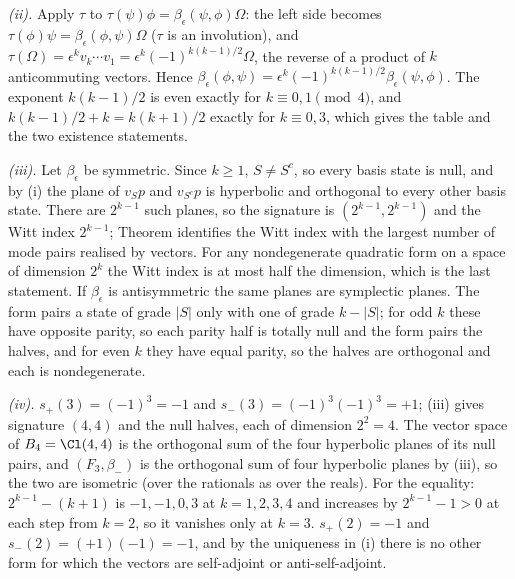 \emph{(ii).} Apply $\tau$ to $\tau(\psi)\phi = \beta_{\epsilon}(\psi, \phi)\Omega$: the left side becomes $\tau(\phi)\psi = \beta_{\epsilon}(\phi, \psi)\Omega$ ($\tau$ is an involution), and $\tau(\Omega) = \epsilon^{k}v_{k}\cdots v_{1} = \epsilon^{k}(-1)^{k(k-1)/2}\Omega$, the reverse of a product of $k$ anticommuting vectors. Hence $\beta_{\epsilon}(\phi, \psi) = \epsilon^{k}(-1)^{k(k-1)/2}\beta_{\epsilon}(\psi, \phi)$. The exponent $k(k-1)/2$ is even exactly for $k \equiv 0, 1 \pmod 4$, and $k(k-1)/2 + k = k(k+1)/2$ exactly for $k \equiv 0, 3$, which gives the table and the two existence statements.

\emph{(iii).} Let $\beta_{\epsilon}$ be symmetric. Since $k \ge 1$, $S \ne S^{c}$, so every basis state is null, and by (i) the plane of $v_{S}p$ and $v_{S^{c}}p$ is hyperbolic and orthogonal to every other basis state. There are $2^{k-1}$ such planes, so the signature is $(2^{k-1}, 2^{k-1})$ and the Witt index $2^{k-1}$; Theorem  identifies the Witt index with the largest number of mode pairs realised by vectors. For any nondegenerate quadratic form on a space of dimension $2^{k}$ the Witt index is at most half the dimension, which is the last statement. If $\beta_{\epsilon}$ is antisymmetric the same planes are symplectic planes. The form pairs a state of grade $|S|$ only with one of grade $k - |S|$; for odd $k$ these have opposite parity, so each parity half is totally null and the form pairs the halves, and for even $k$ they have equal parity, so the halves are orthogonal and each is nondegenerate.

\emph{(iv).} $s_{+}(3) = (-1)^{3} = -1$ and $s_{-}(3) = (-1)^{3}(-1)^{3} = +1$; (iii) gives signature $(4,4)$ and the null halves, each of dimension $2^{2} = 4$. The vector space of $B_{4} = \Cl(4,4)$ is the orthogonal sum of the four hyperbolic planes of its null pairs, and $(F_{3}, \beta_{-})$ is the orthogonal sum of four hyperbolic planes by (iii), so the two are isometric (over the rationals as over the reals). For the equality: $2^{k-1} - (k+1)$ is $-1, -1, 0, 3$ at $k = 1, 2, 3, 4$ and increases by $2^{k-1} - 1 > 0$ at each step from $k = 2$, so it vanishes only at $k = 3$. $s_{+}(2) = -1$ and $s_{-}(2) = (+1)(-1) = -1$, and by the uniqueness in (i) there is no other form for which the vectors are self-adjoint or anti-self-adjoint.

